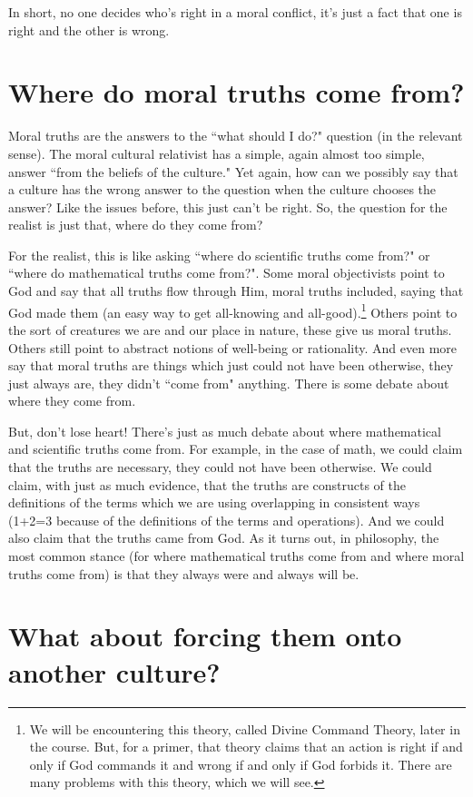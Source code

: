 In short, no one decides who's right in a moral conflict, it's just a fact that one is right and the other is wrong.
\section{Where do moral truths come from?}

Moral truths are the answers to the ``what should I do?" question (in the relevant sense). The moral cultural relativist has a simple, again almost too simple, answer ``from the beliefs of the culture." Yet again, how can we possibly say that a culture has the wrong answer to the question when the culture chooses the answer? Like the issues before, this just can't be right. So, the question for the realist is just that, where do they come from? 

For the realist, this is like asking ``where do scientific truths come from?" or ``where do mathematical truths come from?". Some moral objectivists point to God and say that all truths flow through Him, moral truths included, saying that God made them (an easy way to get all-knowing and all-good).\footnote{We will be encountering this theory, called Divine Command Theory, later in the course. But, for a primer, that theory claims that an action is right if and only if God commands it and wrong if and only if God forbids it. There are many problems with this theory, which we will see.} Others point to the sort of creatures we are and our place in nature, these give us moral truths. Others still point to abstract notions of well-being or rationality.  And even more say that moral truths are things which just could not have been otherwise, they just always are, they didn't ``come from" anything. There is some debate about where they come from.

But, don't lose heart! There's just as much debate about where mathematical and scientific truths come from. For example, in the case of math, we could claim that the truths are necessary, they could not have been otherwise. We could claim, with just as much evidence, that the truths are constructs of the definitions of the terms which we are using overlapping in consistent ways (1+2=3 because of the definitions of the terms and operations). And we could also claim that the truths came from God.  As it turns out, in philosophy, the most common stance (for where mathematical truths come from and where moral truths come from) is that they always were and always will be.
\section{What about forcing them onto another culture?}

